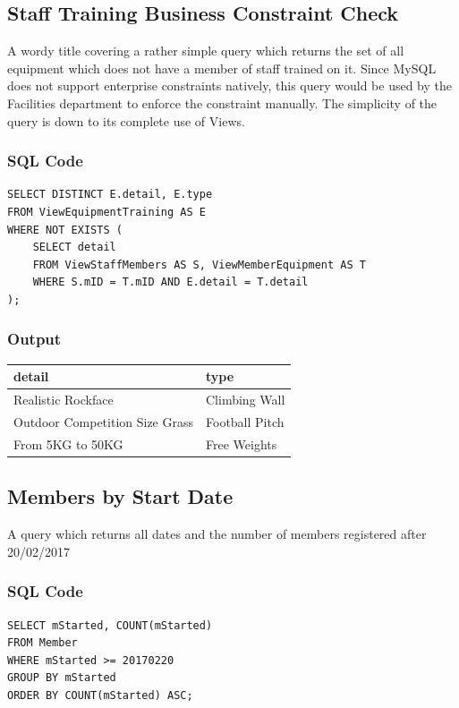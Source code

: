 \documentclass[a4paper, titlepage]{article}
\begin{document}
\subsection{Staff Training Business Constraint Check} \label{subsec:staffq}
A wordy title covering a rather simple query which returns the set of all equipment which does not have a member of staff trained on it. Since MySQL does not support enterprise constraints natively, this query would be used by the Facilities department to enforce the constraint manually. The simplicity of the query is down to its complete use of Views.   

\subsubsection*{SQL Code}
\begin{verbatim}
SELECT DISTINCT E.detail, E.type 
FROM ViewEquipmentTraining AS E
WHERE NOT EXISTS (
	SELECT detail
	FROM ViewStaffMembers AS S, ViewMemberEquipment AS T
	WHERE S.mID = T.mID AND E.detail = T.detail
);
\end{verbatim}

\subsubsection*{Output}
\begin{tabulary}{1.2\textwidth}{ l l}
	detail & type \\ \midrule
	Realistic Rockface & Climbing Wall \\
	Outdoor Competition Size Grass & Football Pitch \\
	From 5KG to 50KG & Free Weights \\
	
	\bottomrule
\end{tabulary}

\subsection{Members by Start Date}
A query which returns all dates and the number of members registered after 20/02/2017
\subsubsection*{SQL Code}
\begin{verbatim}
SELECT mStarted, COUNT(mStarted)
FROM Member
WHERE mStarted >= 20170220
GROUP BY mStarted
ORDER BY COUNT(mStarted) ASC;
\end{verbatim}
\end{document}
